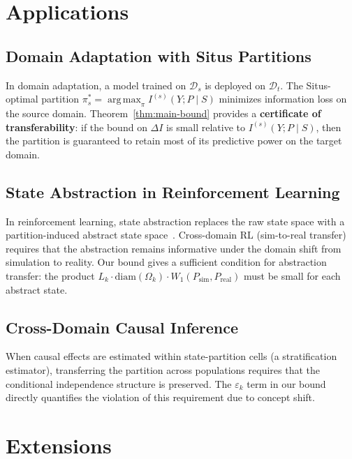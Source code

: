 \documentclass[12pt,a4paper]{article}
\newcommand{\cD}{\mathcal{D}}
\newcommand{\argmax}{\operatorname*{arg\,max}}
\newcommand{\Wass}{W_1}
\newcommand{\diam}{\mathrm{diam}}
\begin{document}
\section{Applications}
\label{sec:applications}

\subsection{Domain Adaptation with Situs Partitions}

In domain adaptation, a model trained on $\cD_s$ is deployed on $\cD_t$.
The Situs-optimal partition $\pi^*_s = \argmax_\pi I^{(s)}(Y;P\mid S)$
minimizes information loss on the source domain.  Theorem~\ref{thm:main-bound}
provides a \textbf{certificate of transferability}: if the bound on
$\Delta I$ is small relative to $I^{(s)}(Y;P\mid S)$, then the partition
is guaranteed to retain most of its predictive power on the target domain.

\subsection{State Abstraction in Reinforcement Learning}

In reinforcement learning, state abstraction replaces the raw state space
with a partition-induced abstract state space~\citep{li2006towards}.
Cross-domain RL (sim-to-real transfer) requires that the abstraction
remains informative under the domain shift from simulation to reality.
Our bound gives a sufficient condition for abstraction transfer:
the product $L_k\cdot\diam(\Omega_k)\cdot\Wass(P_{\text{sim}},P_{\text{real}})$
must be small for each abstract state.

\subsection{Cross-Domain Causal Inference}

When causal effects are estimated within state-partition cells
(a stratification estimator), transferring the partition across
populations requires that the conditional independence structure is
preserved.  The $\varepsilon_k$ term in our bound directly quantifies
the violation of this requirement due to concept shift.

\section{Extensions}
\end{document}
